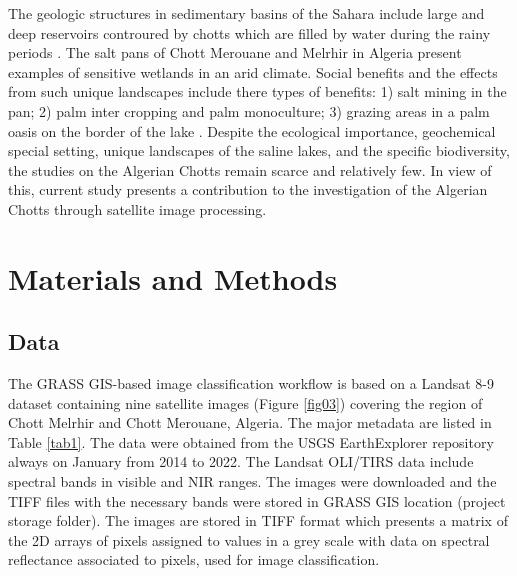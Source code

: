 \documentclass[asi,article,submit,pdftex,moreauthors]{Definitions/mdpi}
\begin{document}
The geologic structures in sedimentary basins of the Sahara include large and deep reservoirs controured by chotts which are filled by water during the rainy periods \cite{HAMICHE2015261}. The salt pans of Chott Merouane and Melrhir in Algeria present examples of sensitive wetlands in an arid climate. Social benefits and the effects from such unique landscapes include there types of benefits: 1) salt mining in the pan; 2) palm inter cropping and palm monoculture; 3) grazing areas in a palm oasis on the border of the lake \cite{Demnati2012}. Despite the ecological importance, geochemical special setting, unique landscapes of the saline lakes, and the specific biodiversity, the studies on the Algerian Chotts remain scarce and relatively few. In view of this, current study presents a contribution to the investigation of the Algerian Chotts through satellite image processing. 

\section{Materials and Methods}

\subsection{Data}

The GRASS GIS-based image classification workflow is based on a Landsat 8-9 dataset containing nine satellite images (Figure \ref{fig03}) covering the region of Chott Melrhir and Chott Merouane, Algeria. The major metadata are listed in Table \ref{tab1}. The data were obtained from the USGS EarthExplorer repository always on January from 2014 to 2022. The Landsat OLI/TIRS data include spectral bands in visible and NIR ranges. The images were downloaded and the TIFF files with the necessary bands were stored in GRASS GIS location (project storage folder). The images are stored in TIFF format which presents a matrix of the 2D arrays of pixels assigned to values in a grey scale with data on spectral reflectance associated to pixels, used for image classification. 
\end{document}
